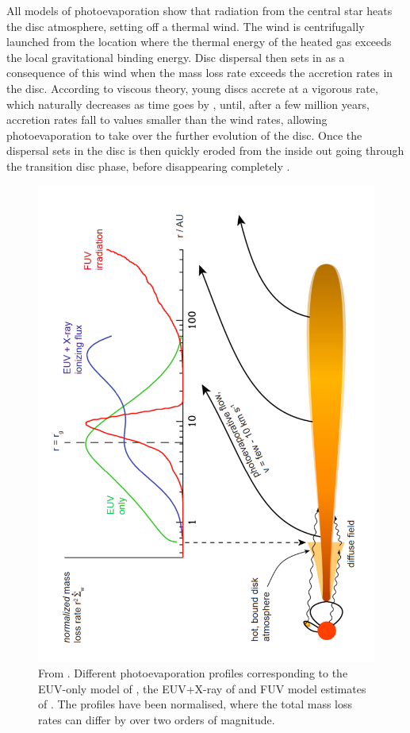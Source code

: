 \documentclass[10pt,fleqn,twoside]{article}
\begin{document}
All models of photoevaporation show that radiation from the central
star heats the disc atmosphere, setting off a thermal wind.
The wind is centrifugally launched from the location where the thermal
energy of the heated gas exceeds the local gravitational binding
energy. 
Disc dispersal then sets in as a consequence of this wind when the mass
loss rate exceeds the accretion rates in the disc. According to
viscous theory, young discs accrete
at a vigorous rate, which naturally decreases as time goes by
\citep[e.g.,][]{2008apsf.book.....H},
until,
after a few million years, accretion rates fall to values smaller than
the wind rates, allowing photoevaporation to take over the further
evolution of the disc. Once the dispersal sets in the disc is then
quickly eroded from the inside out going through the transition disc
phase, before disappearing completely
\citep[see e.g.,][for recent reviews of this process]{2014prpl.conf..475A,
2011ARA&A..49..195A}.


\begin{figure}
  \includegraphics[width=0.75\linewidth, angle = 270]{profiles.pdf}
  \caption{From \citet{2011ARA&A..49..195A}. Different photoevaporation profiles
    corresponding to the EUV-only model of \citet{2006MNRAS.369..216A, 2006MNRAS.369..229A},
    the EUV+X-ray of \citet{2010MNRAS.401.1415O} and FUV model estimates of
    \citet{2009ApJ...705.1237G}. The profiles have been
    normalised, where the total mass loss rates can differ by over two
    orders of magnitude. }
  \label{fig:profiles}
\end{figure}
\end{document}
